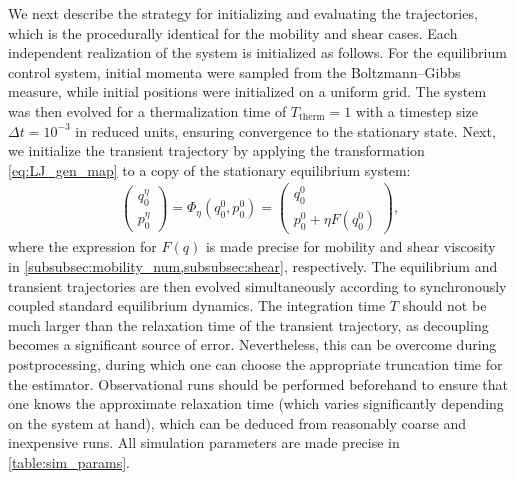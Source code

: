 We next describe the strategy for initializing and evaluating the trajectories, which is the procedurally identical for the mobility and shear cases. Each independent realization of the system is initialized as follows. For the equilibrium control system, initial momenta were sampled from the Boltzmann--Gibbs measure, while initial positions were initialized on a uniform grid. The system was then evolved for a thermalization time of $T_\mathrm{therm} = 1$ with a timestep size $\Delta t=10^{-3}$ in reduced units, ensuring convergence to the stationary state. Next, we initialize the transient trajectory by applying the transformation \eqref{eq:LJ_gen_map} to a copy of the stationary equilibrium system: 
%
\begin{align}
    \begin{pmatrix}
        q_0^\eta \\ p_0^\eta
    \end{pmatrix}
	 = \Phi_\eta(q_0^0,p_0^0) = 
	\begin{pmatrix}
 	  q_0^0 \\ p_0^0 + \eta F(q_0^0)
 	\end{pmatrix},
 	\label{eq:LJ_gen_map}
\end{align}
%
where the expression for $F(q)$ is made precise for mobility and shear viscosity in \cref{subsubsec:mobility_num,subsubsec:shear}, respectively. The equilibrium and transient trajectories are then evolved simultaneously according to synchronously coupled standard equilibrium dynamics. The integration time $T$ should not be much larger than the relaxation time of the transient trajectory, as decoupling becomes a significant source of error. Nevertheless, this can be overcome during postprocessing, during which one can choose the appropriate truncation time for the estimator. Observational runs should be performed beforehand to ensure that one knows the approximate relaxation time (which varies significantly depending on the system at hand), which can be deduced from reasonably coarse and inexpensive runs. All simulation parameters are made precise in \cref{table:sim_params}.
%
